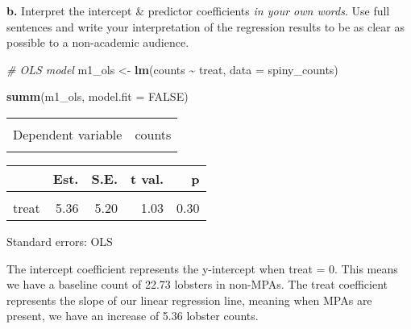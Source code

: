 \documentclass[
]{article}
\newenvironment{Shaded}{\begin{snugshade}}{\end{snugshade}}
\newcommand{\AttributeTok}[1]{\textcolor[rgb]{0.13,0.29,0.53}{#1}}
\newcommand{\CommentTok}[1]{\textcolor[rgb]{0.56,0.35,0.01}{\textit{#1}}}
\newcommand{\ConstantTok}[1]{\textcolor[rgb]{0.56,0.35,0.01}{#1}}
\newcommand{\FunctionTok}[1]{\textcolor[rgb]{0.13,0.29,0.53}{\textbf{#1}}}
\newcommand{\NormalTok}[1]{#1}
\newcommand{\OtherTok}[1]{\textcolor[rgb]{0.56,0.35,0.01}{#1}}
\newcommand{\SpecialCharTok}[1]{\textcolor[rgb]{0.81,0.36,0.00}{\textbf{#1}}}
\begin{document}
\textbf{b.} Interpret the intercept \& predictor coefficients \emph{in
your own words}. Use full sentences and write your interpretation of the
regression results to be as clear as possible to a non-academic
audience.

\begin{Shaded}
\begin{Highlighting}[]
\CommentTok{\# OLS model }
\NormalTok{m1\_ols }\OtherTok{\textless{}{-}} \FunctionTok{lm}\NormalTok{(counts }\SpecialCharTok{\textasciitilde{}}\NormalTok{ treat, }\AttributeTok{data =}\NormalTok{ spiny\_counts)}

\FunctionTok{summ}\NormalTok{(m1\_ols, }\AttributeTok{model.fit =} \ConstantTok{FALSE}\NormalTok{) }
\end{Highlighting}
\end{Shaded}

\begin{table}[!h]
\centering
\begin{tabular}{lr}
\toprule
\cellcolor{gray!10}{Observations} & \cellcolor{gray!10}{252}\\
Dependent variable & counts\\
\cellcolor{gray!10}{Type} & \cellcolor{gray!10}{OLS linear regression}\\
\bottomrule
\end{tabular}
\end{table}  \begin{table}[!h]
\centering
\begin{threeparttable}
\begin{tabular}{lrrrr}
\toprule
  & Est. & S.E. & t val. & p\\
\midrule
\cellcolor{gray!10}{(Intercept)} & \cellcolor{gray!10}{22.73} & \cellcolor{gray!10}{3.57} & \cellcolor{gray!10}{6.36} & \cellcolor{gray!10}{0.00}\\
treat & 5.36 & 5.20 & 1.03 & 0.30\\
\bottomrule
\end{tabular}
\begin{tablenotes}
\item Standard errors: OLS
\end{tablenotes}
\end{threeparttable}
\end{table}

The intercept coefficient represents the y-intercept when treat = 0.
This means we have a baseline count of 22.73 lobsters in non-MPAs. The
treat coefficient represents the slope of our linear regression line,
meaning when MPAs are present, we have an increase of 5.36 lobster
counts.
\end{document}
